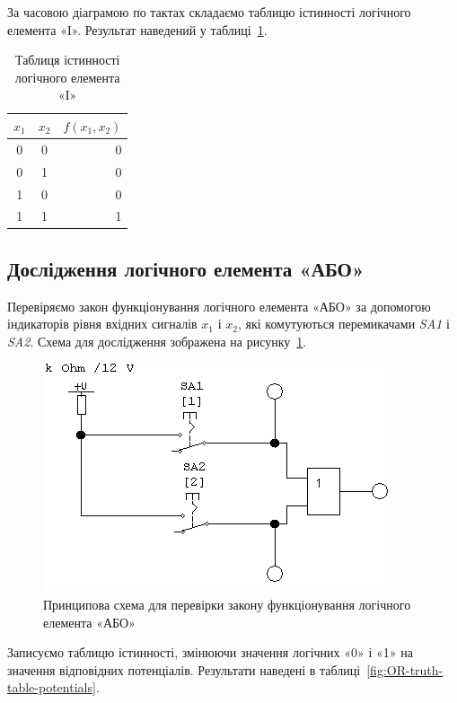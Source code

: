 \documentclass[a4paper,oneside,DIV=10,12pt]{scrartcl}
\newcommand\schel[1]{\textit{#1}}
\begin{document}
			За часовою діаграмою по тактах складаємо таблицю істинності логічного елемента «І». Результат наведений у таблиці~\ref{fig:AND-truth-table}.
			
			\begin{table}[!htbp]
			\centering
				\begin{tabular}{ccr}
					\toprule
						$x_1$ & $x_2$ & $f(x_1, x_2)$\\
					\midrule
						0     & 0     & 0\\
						0     & 1     & 0\\
						1     & 0     & 0\\
						1     & 1     & 1\\
					\bottomrule
				\end{tabular}
			\caption{Таблиця істинності логічного елемента «І»}
			\label{fig:AND-truth-table}
			\end{table}
			
		\subsection{Дослідження логічного елемента «АБО»}
			Перевіряємо закон функціонування логічного елемента «АБО» за допомогою індикаторів рівня вхідних сигналів $x_1$ і $x_2$, які комутуються перемикачами \schel{SA1} і \schel{SA2}. Схема для дослідження зображена на рисунку~\ref{fig:OR-function-law-schematic}.
			
			\begin{figure}[!htbp]
			\centering
				\includegraphics[]{schematics/03-01-OR.png}
			\caption{Принципова схема для перевірки закону функціонування логічного елемента «АБО»}
			\label{fig:OR-function-law-schematic}
			\end{figure}
			
			Записуємо таблицю істинності, змінюючи значення логічних «0» і «1» на значення відповідних потенціалів. Результати наведені в таблиці~\ref{fig:OR-truth-table-potentials}.
			
\end{document}
